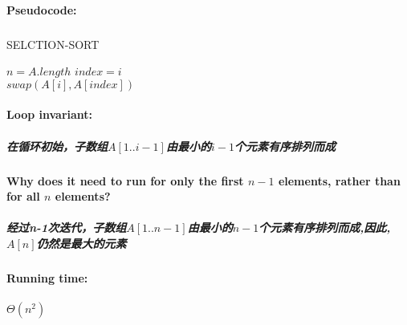 \documentclass[a4paper]{article}
\begin{document}
\paragraph{Pseudocode:}
\subparagraph{}
\begin{algorithm}
    \caption{SELCTION-SORT}
    $n=A.length$
     {
        $index=i$\\
         {
        }
        \BlankLine
        $swap(A[i],A[index])$\\
    }
\end{algorithm}
\paragraph{Loop invariant:}
\subparagraph{在循环初始，子数组$A[1..i-1]$由最小的$i-1$个元素有序排列而成}
\paragraph{Why does it need to run for only the first $n-1$ elements, rather than for all $n$ elements?}
\subparagraph{经过n-1次迭代，子数组$A[1..n-1]$由最小的$n-1$个元素有序排列而成,因此,$A[n]$仍然是最大的元素}
\paragraph{Running time:}
\subparagraph{$\Theta(n^2)$}
\end{document}
